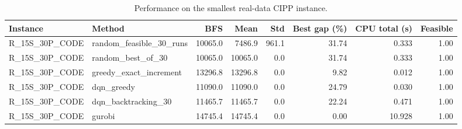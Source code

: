 \begin{table}[t]
\centering
\caption{Performance on the smallest real-data CIPP instance.}
\begin{tabular}{llrrrrrr}
\toprule
Instance & Method & BFS & Mean & Std & Best gap (\%) & CPU total (s) & Feasible \\
\midrule
R\_15S\_30P\_CODE & random\_feasible\_30\_runs & 10065.0 & 7486.9 & 961.1 & 31.74 & 0.333 & 1.00 \\
R\_15S\_30P\_CODE & random\_best\_of\_30 & 10065.0 & 10065.0 & 0.0 & 31.74 & 0.333 & 1.00 \\
R\_15S\_30P\_CODE & greedy\_exact\_increment & 13296.8 & 13296.8 & 0.0 & 9.82 & 0.012 & 1.00 \\
R\_15S\_30P\_CODE & dqn\_greedy & 11090.0 & 11090.0 & 0.0 & 24.79 & 0.030 & 1.00 \\
R\_15S\_30P\_CODE & dqn\_backtracking\_30 & 11465.7 & 11465.7 & 0.0 & 22.24 & 0.471 & 1.00 \\
R\_15S\_30P\_CODE & gurobi & 14745.4 & 14745.4 & 0.0 & 0.00 & 10.928 & 1.00 \\
\bottomrule
\end{tabular}
\end{table}
